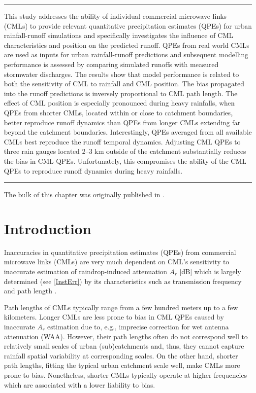 \documentclass{ctuthesis}\usepackage[]{graphicx}\usepackage[]{color}
\begin{document}
\rule{\textwidth}{0.4pt}
This study addresses the ability of individual commercial microwave links (CMLs) to provide relevant quantitative precipitation estimates (QPEs) for urban rainfall-runoff simulations and specifically investigates the influence of CML characteristics and position on the predicted runoff. QPEs from real world CMLs are used as inputs for urban rainfall-runoff predictions and subsequent modelling performance is assessed by comparing simulated runoffs with measured stormwater discharges. The results show that model performance is related to both the sensitivity of CML to rainfall and CML position. The bias propagated into the runoff predictions is inversely proportional to CML path length. The effect of CML position is especially pronounced during heavy rainfalls, when QPEs from shorter CMLs, located within or close to catchment boundaries, better reproduce runoff dynamics than QPEs from longer CMLs extending far beyond the catchment boundaries. Interestingly, QPEs averaged from all available CMLs best reproduce the runoff temporal dynamics. Adjusting CML QPEs to three rain gauges located 2--3 km outside of the catchment substantially reduces the bias in CML QPEs. Unfortunately, this compromises the ability of the CML QPEs to reproduce runoff dynamics during heavy rainfalls.
\rule[0.2cm]{\textwidth}{0.4pt}

{\footnotesize The bulk of this chapter was originally published in \cite{pastorekCommercialMicrowaveLinks2019}. 
}

\section{Introduction}

Inaccuracies in quantitative precipitation estimates (QPEs) from commercial microwave links (CMLs) are very much dependent on CML's sensitivity to inaccurate estimation of raindrop-induced attenuation $A_r$ [dB] which is largely determined (see \ref{InstErr}) by its characteristics such as transmission frequency and path length \citep{leijnseMicrowaveLinkRainfall2008}.
       
Path lengths of CMLs typically range from a few hundred meters up to a few kilometers. Longer CMLs are less prone to bias in CML QPEs caused by inaccurate $A_r$ estimation due to, e.g., imprecise correction for wet antenna attenuation (WAA). However, their path lengths often do not correspond well to relatively small scales of urban (sub)catchments and, thus, they cannot capture rainfall spatial variability at corresponding scales. On the other hand, shorter path lengths, fitting the typical urban catchment scale well, make CMLs more prone to bias. Nonetheless, shorter CMLs typically operate at higher frequencies which are associated with a lower liability to bias. 
\end{document}
